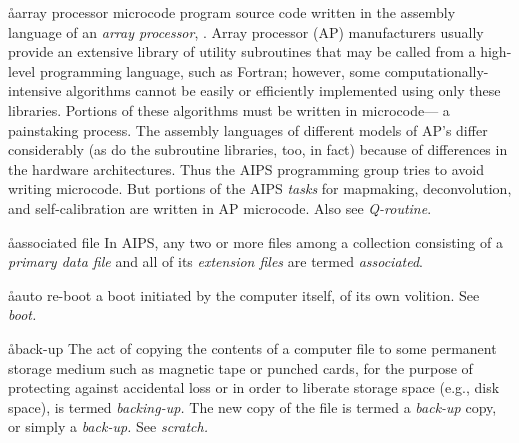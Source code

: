 \aa{array processor microcode}
program source code written in the assembly language of an
{\it array processor}, \qv.
Array processor (AP) manufacturers usually provide an extensive
library of utility subroutines that may be called from a high-level
programming language, such as Fortran;
however, some computationally-intensive algorithms cannot be
easily or efficiently implemented using only these libraries.
Portions of these algorithms must be written in microcode---%
a painstaking process.
The assembly languages of different models of AP's differ considerably
(as do the subroutine libraries, too, in fact)
because of differences in the hardware architectures.
Thus the AIPS programming group tries to avoid writing microcode.
But portions of the AIPS {\it tasks} for mapmaking, deconvolution,
and self-calibration are written in AP microcode.
Also see {\it Q-routine}.

\aa{associated file}
In AIPS, any two or more files among a collection
consisting of a {\it primary data file} and all of
its {\it extension files} are termed {\it associated}.

\aa{auto re-boot}
a boot initiated by the computer itself, of its own volition.
See {\it boot.}

\aa{back-up}
The act of copying the contents of a computer file
to some permanent storage medium such as magnetic tape or punched cards,
for the purpose of protecting against accidental loss
or in order to liberate storage space (e.g., disk space),
is termed {\it backing-up.}
The new copy of the file is termed a {\it back-up} copy,
or simply a {\it back-up.}
See {\it scratch.}

